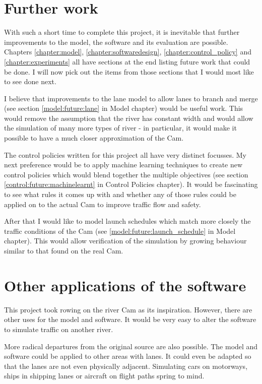   \section{Further work}
  With such a short time to complete this project, it is inevitable that further improvements to the model, the software and its evaluation are possible. Chapters \ref{chapter:model}, \ref{chapter:softwaredesign}, \ref{chapter:control_policy} and \ref{chapter:experiments} all have sections at the end listing future work that could be done. I will now pick out the items from those sections that I would most like to see done next.
  
  I believe that improvements to the lane model to allow lanes to branch and merge (see section \ref{model:future:lane} in Model chapter) would be useful work. This would remove the assumption that the river has constant width and would allow the simulation of many more types of river - in particular, it would make it possible to have a much closer approximation of the Cam.
  
  The control policies written for this project all have very distinct focusses. My next preference would be to apply machine learning techniques to create new control policies which would blend together the multiple objectives (see section \ref{control:future:machinelearnt} in Control Policies chapter). It would be fascinating to see what rules it comes up with and whether any of those rules could be applied on to the actual Cam to improve traffic flow and safety.
  
  After that I would like to model launch schedules which match more closely the traffic conditions of the Cam (see \ref{model:future:launch_schedule} in Model chapter). This would allow verification of the simulation by growing behaviour similar to that found on the real Cam.
  
  \section{Other applications of the software}\label{conclusions:applications}
  This project took rowing on the river Cam as its inspiration. However, there are other uses for the model and software. It would be very easy to alter the software to simulate traffic on another river.
  
  More radical departures from the original source are also possible. The model and software could be applied to other areas with lanes. It could even be adapted so that the lanes are not even physically adjacent. Simulating cars on motorways, ships in shipping lanes or aircraft on flight paths spring to mind.
  
